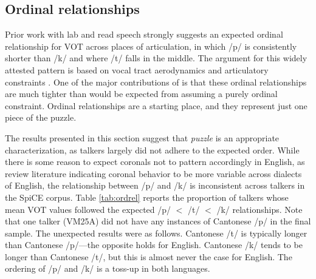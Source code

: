 \subsection{Ordinal relationships}\label{ch4:sec:ordrel}

Prior work with lab and read speech strongly suggests an expected ordinal relationship for VOT across places of articulation, in which /p/ is consistently shorter than /k/ and where /t/ falls in the middle. The argument for this widely attested pattern is based on vocal tract aerodynamics and articulatory constraints \citep{cho_1999_vot}. One of the major contributions of \citet{chodroff_2017_structure} is that these ordinal relationships are much tighter than would be expected from assuming a purely ordinal constraint. Ordinal relationships are a starting place, and they represent just one piece of the puzzle. 

The results presented in this section suggest that \textit{puzzle} is an appropriate characterization, as talkers largely did not adhere to the expected order. While there is some reason to expect coronals not to pattern accordingly in English, as \citet{chodroff_2017_structure} review literature indicating coronal behavior to be more variable across dialects of English, the relationship between /p/ and /k/ is inconsistent across talkers in the SpiCE corpus. Table \ref{tab:ordrel} reports the proportion of talkers whose mean VOT values followed the expected /p/ $<$ /t/ $<$ /k/ relationships. Note that one talker (VM25A) did not have any instances of Cantonese /p/ in the final sample. The unexpected results were as follows. Cantonese /t/ is typically longer than Cantonese /p/---the opposite holds for English. Cantonese /k/ tends to be longer than Cantonese /t/, but this is almost never the case for English. The ordering of /p/ and /k/ is a toss-up in both languages. 


